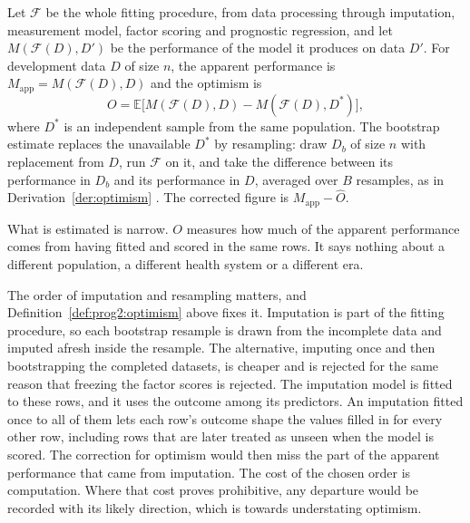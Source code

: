 \begin{definition}
\label{def:prog2:optimism}
Let $\mathcal F$ be the whole fitting procedure, from data processing through
imputation, measurement model, factor scoring and prognostic regression, and
let $M(\mathcal F(D),D')$ be the performance of the model it produces on data
$D'$. For development data $D$ of size $n$, the apparent performance is
$M_{\mathrm{app}}=M(\mathcal F(D),D)$ and the optimism is
\begin{equation}
  O=\mathbb E\bigl[M(\mathcal F(D),D)-M(\mathcal F(D),D^{\ast})\bigr],
  \label{eq:optimism}
\end{equation}
where $D^{\ast}$ is an independent sample from the same population. The
bootstrap estimate replaces the unavailable $D^{\ast}$ by resampling: draw
$D_b$ of size $n$ with replacement from $D$, run $\mathcal F$ on it, and take
the difference between its performance in $D_b$ and its performance in $D$,
averaged over $B$ resamples, as in Derivation~\ref{der:optimism}
\citep{efron_tibshirani_1993,steyerberg_2019}. The corrected figure is
$M_{\mathrm{app}}-\widehat O$.

What is estimated is narrow. $O$ measures how much of the apparent performance
comes from having fitted and scored in the same rows. It says nothing about a
different population, a different health system or a different era.
\end{definition}

The order of imputation and resampling matters, and Definition~\ref{def:prog2:optimism} above fixes it. Imputation is part of the fitting procedure, so each bootstrap resample is drawn from the incomplete data and imputed afresh inside the resample. The alternative, imputing once and then bootstrapping the completed datasets, is cheaper and is rejected for the same reason that freezing the factor scores is rejected. The imputation model is fitted to these rows, and it uses the outcome among its predictors. An imputation fitted once to all of them lets each row's outcome shape the values filled in for every other row, including rows that are later treated as unseen when the model is scored. The correction for optimism would then miss the part of the apparent performance that came from imputation. The cost of the chosen order is computation. Where that cost proves prohibitive, any departure would be recorded with its likely direction, which is towards understating optimism.


